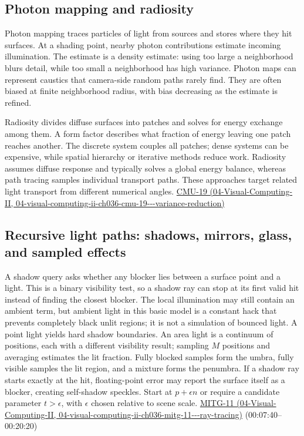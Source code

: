 \subsection{Photon mapping and radiosity}\label{03-visual-computing-i-ch011-photon-mapping-and-radiosity}

Photon mapping traces particles of light from sources and stores where they hit surfaces. At a shading point, nearby photon contributions estimate incoming illumination. The estimate is a density estimate: using too large a neighborhood blurs detail, while too small a neighborhood has high variance. Photon maps can represent caustics that camera-side random paths rarely find. They are often biased at finite neighborhood radius, with bias decreasing as the estimate is refined.

Radiosity divides diffuse surfaces into patches and solves for energy exchange among them. A form factor describes what fraction of energy leaving one patch reaches another. The discrete system couples all patches; dense systems can be expensive, while spatial hierarchy or iterative methods reduce work. Radiosity assumes diffuse response and typically solves a global energy balance, whereas path tracing samples individual transport paths. These approaches target related light transport from different numerical angles. \href{../04-Visual-Computing-II/main.pdf\#nameddest=04-visual-computing-ii-ch036-cmu-19---variance-reduction}{CMU-19 (04-Visual-Computing-II, 04-visual-computing-ii-ch036-cmu-19-\/-\/-variance-reduction)}

\subsection{Recursive light paths: shadows, mirrors, glass, and sampled effects}\label{03-visual-computing-i-ch011-recursive-light-paths-shadows-mirrors-glass-and-sampled-effects}

A shadow query asks whether any blocker lies between a surface point and a light. This is a binary visibility test, so a shadow ray can stop at its first valid hit instead of finding the closest blocker. The local illumination may still contain an ambient term, but ambient light in this basic model is a constant hack that prevents completely black unlit regions; it is not a simulation of bounced light. A point light yields hard shadow boundaries. An area light is a continuum of positions, each with a different visibility result; sampling \(M\) positions and averaging estimates the lit fraction. Fully blocked samples form the umbra, fully visible samples the lit region, and a mixture forms the penumbra. If a shadow ray starts exactly at the hit, floating-point error may report the surface itself as a blocker, creating self-shadow speckles. Start at \(p+\epsilon n\) or require a candidate parameter \(t>\epsilon\), with \(\epsilon\) chosen relative to scene scale. \href{../04-Visual-Computing-II/main.pdf\#nameddest=04-visual-computing-ii-ch036-mitg-11---ray-tracing}{MITG-11 (04-Visual-Computing-II, 04-visual-computing-ii-ch036-mitg-11-\/-\/-ray-tracing)} (00:07:40--00:20:20)

